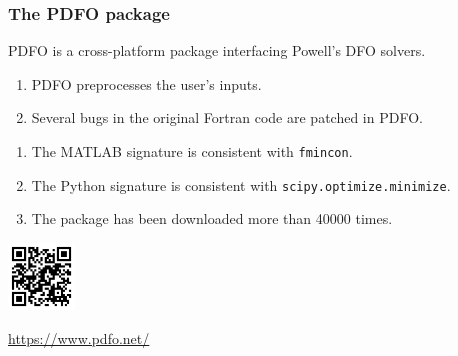 \documentclass{polyu-presentation}
\begin{document}
\begin{frame}
    \frametitle{The PDFO package}

    \begin{block}{}
        \alert{PDFO} is a \alert{cross-platform} package interfacing Powell's DFO solvers.
        \begin{enumerate}
            \item PDFO \alert{preprocesses} the user's inputs.
            \item Several \alert{bugs} in the original Fortran code are \alert{patched} in PDFO.
        \end{enumerate}
    \end{block}

    \medskip

    \begin{enumerate}
        \item The \alert{MATLAB} signature is consistent with \texttt{fmincon}.
        \item The \alert{Python} signature is consistent with \texttt{scipy.optimize.minimize}.
        \item The package has been downloaded more than \alert{\num{40000} times}.
    \end{enumerate}

    \smallskip
    
	\begin{center}
        \href{https://www.pdfo.net/}{\includegraphics[width=0.7in]{images/qr/pdfo.png}}

        \scriptsize\url{https://www.pdfo.net/}
    \end{center}
\end{frame}
\end{document}
